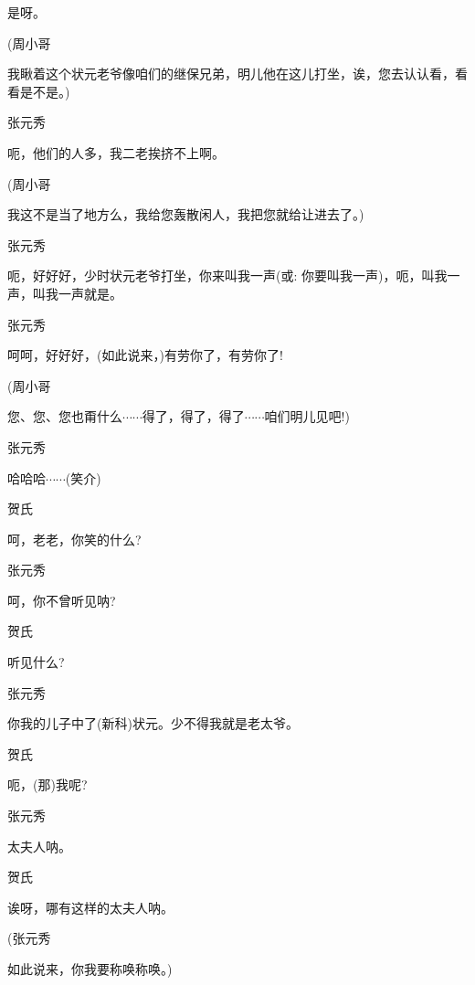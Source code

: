 是呀。

(周小哥

我瞅着这个状元老爷像咱们的继保兄弟，明儿他在这儿打坐，诶，您去认认看，看看是不是。)

张元秀\hspace{20pt}~

呃，他们的人多，我二老挨挤不上啊。

(周小哥\hspace{20pt}~

我这不是当了地方么，我给您轰散闲人，我把您就给让进去了。)

张元秀

呃，好好好，少时状元老爷打坐，你来叫我一声({\akai 或}: 你要叫我一声)，呃，叫我一声，叫我一声就是。

张元秀\hspace{20pt}~

呵呵，好好好，(如此说来，)有劳你了，有劳你了!

(周小哥

您、您、您也甭什么$\cdots{}\cdots{}$得了，得了，得了$\cdots{}\cdots{}$咱们明儿见吧!)

张元秀\hspace{20pt}~

哈哈哈$\cdots{}\cdots{}$(笑介)

贺氏\hspace{30pt}~

呵，老老，你笑的什么?

张元秀\hspace{20pt}~

呵，你不曾听见呐?

贺氏\hspace{30pt}~

听见什么?

张元秀\hspace{20pt}~

你我的儿子中了(新科)状元。少不得我就是老太爷。

贺氏\hspace{30pt}~

呃，(那)我呢?

张元秀\hspace{20pt}~

太夫人呐。

贺氏\hspace{30pt}~

诶呀，哪有这样的太夫人呐。

(张元秀\hspace{20pt}~

如此说来，你我要称唤称唤。)

